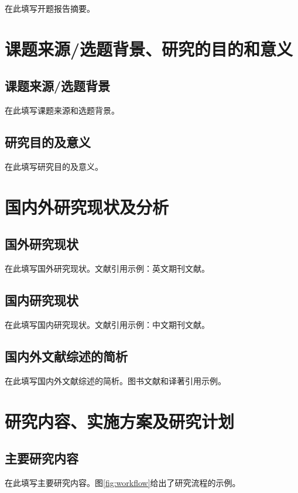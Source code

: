 \documentclass[UTF8,fontset=none,zihao=-4,linespread=1,a4paper]{ctexart}
\begin{document}
\MakeProposalCover

\begin{proposalabstract}
在此填写开题报告摘要。
\end{proposalabstract}


\section{课题来源/选题背景、研究的目的和意义}
\subsection{课题来源/选题背景}
在此填写课题来源和选题背景。

\subsection{研究目的及意义}
在此填写研究目的及意义。

\section{国内外研究现状及分析}
\subsection{国外研究现状}
在此填写国外研究现状。文献引用示例：英文期刊文献\cite{jaworski2009}。

\subsection{国内研究现状}
在此填写国内研究现状。文献引用示例：中文期刊文献\cite{liang1997}。

\subsection{国内外文献综述的简析}
在此填写国内外文献综述的简析。图书文献和译著引用示例\cite{tang1999,hosney1989}。

\section{研究内容、实施方案及研究计划}
\subsection{主要研究内容}
在此填写主要研究内容。图\ref{fig:workflow}给出了研究流程的示例。
\end{document}
